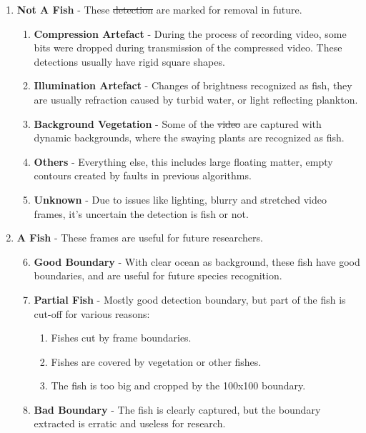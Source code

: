 \documentclass[bsc,logo,twoside,fullspacing,parskip]{infthesis}
\providecommand{\DIFadd}[1]{{\protect\color{blue}\uwave{#1}}} %
\providecommand{\DIFdel}[1]{{\protect\color{red}\sout{#1}}}                      %
\providecommand{\DIFaddbegin}{} %
\providecommand{\DIFaddend}{} %
\providecommand{\DIFdelbegin}{} %
\providecommand{\DIFdelend}{} %
\newcommand{\DIFscaledelfig}{0.5}
\newlength{\DIFdelgraphicswidth} %
\newlength{\DIFdelgraphicsheight} %
\newcommand{\DIFaddincludegraphics}[2][]{{\color{blue}\fbox{\DIFOincludegraphics[#1]{#2}}}} %
\newcommand{\DIFdelincludegraphics}[2][]{%
\sbox{\DIFdelgraphicsbox}{\DIFOincludegraphics[#1]{#2}}%
\settoboxwidth{\DIFdelgraphicswidth}{\DIFdelgraphicsbox} %
\settoboxtotalheight{\DIFdelgraphicsheight}{\DIFdelgraphicsbox} %
\scalebox{\DIFscaledelfig}{%
\parbox[b]{\DIFdelgraphicswidth}{\usebox{\DIFdelgraphicsbox}\\[-\baselineskip] \rule{\DIFdelgraphicswidth}{0em}}\llap{\resizebox{\DIFdelgraphicswidth}{\DIFdelgraphicsheight}{%
\setlength{\unitlength}{\DIFdelgraphicswidth}%
\begin{picture}(1,1)%
\thicklines\linethickness{2pt} %
{\color[rgb]{1,0,0}\put(0,0){\framebox(1,1){}}}%
{\color[rgb]{1,0,0}\put(0,0){\line( 1,1){1}}}%
{\color[rgb]{1,0,0}\put(0,1){\line(1,-1){1}}}%
\end{picture}%
}\hspace*{3pt}}} %
} %
\DeclareRobustCommand{\DIFaddbegin}{\DIFOaddbegin \let\includegraphics\DIFaddincludegraphics} %
\DeclareRobustCommand{\DIFaddend}{\DIFOaddend \let\includegraphics\DIFOincludegraphics} %
\DeclareRobustCommand{\DIFdelbegin}{\DIFOdelbegin \let\includegraphics\DIFdelincludegraphics} %
\DeclareRobustCommand{\DIFdelend}{\DIFOaddend \let\includegraphics\DIFOincludegraphics} %
\begin{document}
\begin{enumerate}
   \setlength{\parskip}{3pt}

 \item \textbf{Not A Fish} - These \DIFdelbegin \DIFdel{detection }\DIFdelend \DIFaddbegin \DIFadd{detections }\DIFaddend are marked for removal in future.
 \begin{enumerate}
   \item \textbf{Compression Artefact} - During the process of recording video, some bits were dropped during transmission of the compressed video. These detections usually have rigid square shapes.
   \item \textbf{Illumination Artefact} - Changes of brightness recognized as fish, they are usually refraction caused by turbid water, or light reflecting plankton.
   \item \textbf{Background Vegetation} - Some of the \DIFdelbegin \DIFdel{video }\DIFdelend \DIFaddbegin \DIFadd{videos }\DIFaddend are captured with dynamic backgrounds, where the swaying plants are recognized as fish.
   \item \textbf{Others} - Everything else, this includes large floating matter, empty contours created by faults in previous algorithms.
   \item \textbf{Unknown} - Due to issues like lighting, blurry and stretched video frames, it's uncertain the detection is fish or not.
 \end{enumerate}

 \item \textbf{A Fish} - These frames are useful for future researchers.
 \begin{enumerate}
   \setcounter{enumii}{5} 
   \item \textbf{Good Boundary} - With clear ocean as background, these fish have good boundaries, and are useful for future species recognition.
   \item \textbf{Partial Fish} - Mostly good detection boundary, but part of the fish is cut-off for various reasons:
    \begin{enumerate}
      \item Fishes cut by frame boundaries.
      \item Fishes are covered by vegetation or other fishes.
      \item The fish is too big and cropped by the 100x100 boundary.
    \end{enumerate}
   \item \textbf{Bad Boundary} - The fish is clearly captured, but the boundary extracted is erratic and useless for research. 
 \end{enumerate}


\end{enumerate}
\end{document}
